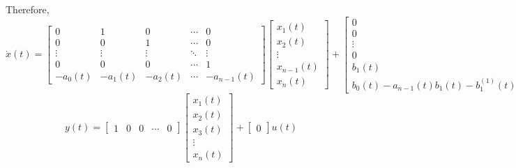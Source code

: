 Therefore,
\[
    \boxed{
        \dot{x}(t)
        =
        \begin{bmatrix}
            0       & 1       & 0       & \cdots & 0           \\
            0       & 0       & 1       & \cdots & 0           \\
            \vdots  & \vdots  & \vdots  & \ddots & \vdots      \\
            0       & 0       & 0       & \cdots & 1           \\
            -a_0(t) & -a_1(t) & -a_2(t) & \cdots & -a_{n-1}(t)
        \end{bmatrix}
        \begin{bmatrix}
            x_1(t)     \\
            x_2(t)     \\
            \vdots     \\
            x_{n-1}(t) \\
            x_n(t)
        \end{bmatrix}
        +
        \begin{bmatrix}
            0      \\
            0      \\
            \vdots \\
            0      \\
            b_1(t) \\
            b_0(t) - a_{n-1}(t)b_1(t) - b_1^{(1)}(t)
        \end{bmatrix}
        u(t)
    }
\]
\[
    \boxed{
        y(t)
        =
        \begin{bmatrix}
            1 & 0 & 0 & \cdots & 0
        \end{bmatrix}
        \begin{bmatrix}
            x_1(t) \\
            x_2(t) \\
            x_3(t) \\
            \vdots \\
            x_n(t)
        \end{bmatrix}
        +
        \begin{bmatrix}
            0
        \end{bmatrix}
        u(t)
    }
\]
